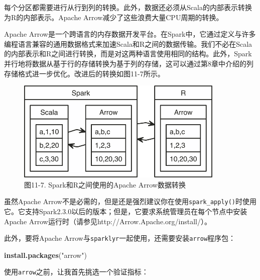 \documentclass[
]{article}
\newenvironment{Shaded}{\begin{snugshade}}{\end{snugshade}}
\newcommand{\DecValTok}[1]{\textcolor[rgb]{0.00,0.00,0.81}{#1}}
\newcommand{\FloatTok}[1]{\textcolor[rgb]{0.00,0.00,0.81}{#1}}
\newcommand{\KeywordTok}[1]{\textcolor[rgb]{0.13,0.29,0.53}{\textbf{#1}}}
\newcommand{\NormalTok}[1]{#1}
\newcommand{\OperatorTok}[1]{\textcolor[rgb]{0.81,0.36,0.00}{\textbf{#1}}}
\newcommand{\StringTok}[1]{\textcolor[rgb]{0.31,0.60,0.02}{#1}}
\begin{document}
每个分区都需要进行从行到列的转换。此外，数据还必须从Scala的内部表示转换为R的内部表示。Apache
Arrow减少了这些浪费大量CPU周期的转换。

Apache
Arrow是一个跨语言的内存数据开发平台。在Spark中，它通过定义与许多编程语言兼容的通用数据格式来加速Scala和R之间的数据传输。我们不必在Scala的内部表示和R之间进行转换，而是对这两种语言使用相同的结构。此外，Spark并行地将数据从基于行的存储转换为基于列的存储，这可以通过第8章中介绍的列存储格式进一步优化。改进后的转换如图11-7所示。

\begin{figure}
\centering
\includegraphics{figures/11_7.png}
\caption{图11-7. Spark和R之间使用的Apache Arrow数据转换}
\end{figure}

虽然Apache
Arrow不是必需的，但是还是强烈建议你在使用\texttt{spark\_apply()}时使用它。它支持Spark2.3.0以后的版本；但是，它要求系统管理员在每个节点中安装Apache
Arrow运行时（请参见http://Arrow.Apache.org/install/）。

此外，要将Apache
Arrow与\texttt{sparklyr}一起使用，还需要安装\texttt{arrow}程序包：

\begin{Shaded}
\begin{Highlighting}[]
\KeywordTok{install.packages}\NormalTok{(}\StringTok{"arrow"}\NormalTok{)}
\end{Highlighting}
\end{Shaded}

使用\texttt{arrow}之前，让我首先挑选一个验证指标：

\begin{Shaded}
\end{Shaded}
\end{document}
